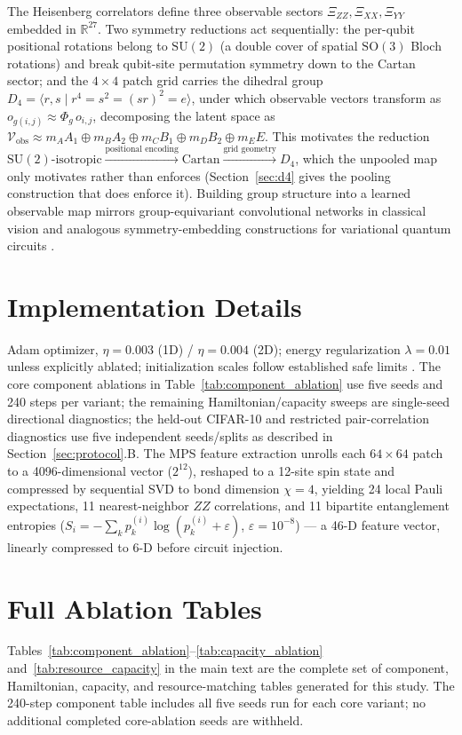 \documentclass[journal]{IEEEtran}
\begin{document}
The Heisenberg correlators define three observable sectors $\Xi_{ZZ},\Xi_{XX},\Xi_{YY}$ embedded in $\mathbb{R}^{27}$. Two symmetry reductions act sequentially: the per-qubit positional rotations belong to $\mathrm{SU}(2)$ (a double cover of spatial $\mathrm{SO}(3)$ Bloch rotations) and break qubit-site permutation symmetry down to the Cartan sector; and the $4\times4$ patch grid carries the dihedral group $D_4=\langle r,s\mid r^4=s^2=(sr)^2=e\rangle$, under which observable vectors transform as $o_{g(i,j)}\approx\Phi_g\,o_{i,j}$, decomposing the latent space as $\mathcal{V}_{\text{obs}}\approx m_AA_1\oplus m_BA_2\oplus m_CB_1\oplus m_DB_2\oplus m_EE$. This motivates the reduction $\mathrm{SU}(2)\text{-isotropic}\xrightarrow{\text{positional encoding}}\text{Cartan}\xrightarrow{\text{grid geometry}}D_4$, which the unpooled map only motivates rather than enforces (Section~\ref{sec:d4} gives the pooling construction that does enforce it). Building group structure into a learned observable map mirrors group-equivariant convolutional networks in classical vision \cite{Cohen2016} and analogous symmetry-embedding constructions for variational quantum circuits \cite{Meyer2023}.

\section{Implementation Details}
\label{app:implementation}
Adam optimizer, $\eta=0.003$ (1D) / $\eta=0.004$ (2D); energy regularization $\lambda=0.01$ unless explicitly ablated; initialization scales follow established safe limits \cite{Cerezo2021, Xu2021}. The core component ablations in Table~\ref{tab:component_ablation} use five seeds and 240 steps per variant; the remaining Hamiltonian/capacity sweeps are single-seed directional diagnostics; the held-out CIFAR-10 and restricted pair-correlation diagnostics use five independent seeds/splits as described in Section~\ref{sec:protocol}.B. The MPS feature extraction unrolls each $64\times64$ patch to a 4096-dimensional vector ($2^{12}$), reshaped to a 12-site spin state and compressed by sequential SVD to bond dimension $\chi=4$, yielding 24 local Pauli expectations, 11 nearest-neighbor $ZZ$ correlations, and 11 bipartite entanglement entropies ($S_i=-\sum_k p_k^{(i)}\log(p_k^{(i)}+\varepsilon)$, $\varepsilon=10^{-8}$) --- a 46-D feature vector, linearly compressed to 6-D before circuit injection.

\section{Full Ablation Tables}
\label{app:full_tables}
Tables~\ref{tab:component_ablation}--\ref{tab:capacity_ablation} and~\ref{tab:resource_capacity} in the main text are the complete set of component, Hamiltonian, capacity, and resource-matching tables generated for this study. The 240-step component table includes all five seeds run for each core variant; no additional completed core-ablation seeds are withheld.
\end{document}

